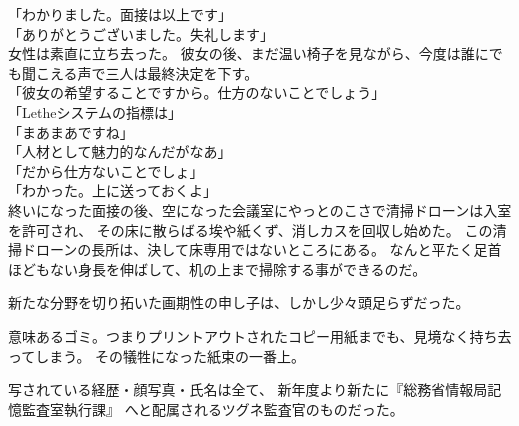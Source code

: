 \documentclass[../NenokuniMain]{subfiles}
\begin{document}
「わかりました。面接は以上です」\\
「ありがとうございました。失礼します」\\
女性は素直に立ち去った。
彼女の後、まだ温い椅子を見ながら、今度は誰にでも聞こえる声で三人は最終決定を下す。\\
「彼女の希望することですから。仕方のないことでしょう」\\
「Letheシステムの指標は」\\
「まあまあですね」\\
「人材として魅力的なんだがなあ」\\
「だから仕方ないことでしょ」\\
「わかった。上に送っておくよ」\\

終いになった面接の後、空になった会議室にやっとのこさで清掃ドローンは入室を許可され、
その床に散らばる埃や紙くず、消しカスを回収し始めた。
この清掃ドローンの長所は、決して床専用ではないところにある。
なんと平たく足首ほどもない身長を伸ばして、机の上まで掃除する事ができるのだ。

新たな分野を切り拓いた画期性の申し子は、しかし少々頭足らずだった。

意味あるゴミ。つまりプリントアウトされたコピー用紙までも、見境なく持ち去ってしまう。
その犠牲になった紙束の一番上。

写されている経歴・顔写真・氏名は全て、
新年度より新たに『総務省情報局記憶監査室執行課』
へと配属されるツグネ監査官のものだった。
\end{document}
